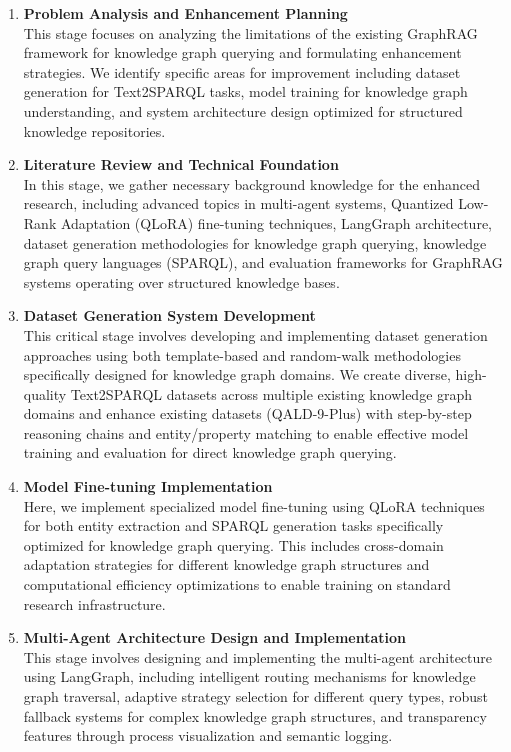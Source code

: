 \begin{enumerate}
    \item \textbf{Problem Analysis and Enhancement Planning} \\
    This stage focuses on analyzing the limitations of the existing GraphRAG framework for knowledge graph querying and formulating enhancement strategies. We identify specific areas for improvement including dataset generation for Text2SPARQL tasks, model training for knowledge graph understanding, and system architecture design optimized for structured knowledge repositories.

    \item \textbf{Literature Review and Technical Foundation} \\
    In this stage, we gather necessary background knowledge for the enhanced research, including advanced topics in multi-agent systems, Quantized Low-Rank Adaptation (QLoRA) fine-tuning techniques, LangGraph architecture, dataset generation methodologies for knowledge graph querying, knowledge graph query languages (SPARQL), and evaluation frameworks for GraphRAG systems operating over structured knowledge bases.

    \item \textbf{Dataset Generation System Development} \\
    This critical stage involves developing and implementing dataset generation approaches using both template-based and random-walk methodologies specifically designed for knowledge graph domains. We create diverse, high-quality Text2SPARQL datasets across multiple existing knowledge graph domains and enhance existing datasets (QALD-9-Plus) with step-by-step reasoning chains and entity/property matching to enable effective model training and evaluation for direct knowledge graph querying.

    \item \textbf{Model Fine-tuning Implementation} \\
    Here, we implement specialized model fine-tuning using QLoRA techniques for both entity extraction and SPARQL generation tasks specifically optimized for knowledge graph querying. This includes cross-domain adaptation strategies for different knowledge graph structures and computational efficiency optimizations to enable training on standard research infrastructure.

    \item \textbf{Multi-Agent Architecture Design and Implementation} \\
    This stage involves designing and implementing the multi-agent architecture using LangGraph, including intelligent routing mechanisms for knowledge graph traversal, adaptive strategy selection for different query types, robust fallback systems for complex knowledge graph structures, and transparency features through process visualization and semantic logging.


\end{enumerate}

